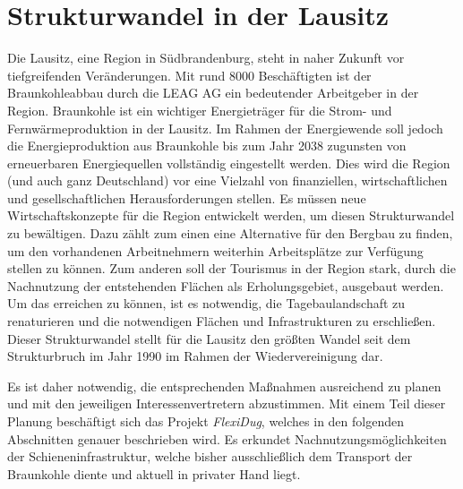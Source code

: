 \section{Strukturwandel in der Lausitz}

Die Lausitz, eine Region in Südbrandenburg, steht in naher Zukunft vor tiefgreifenden Veränderungen. Mit rund 8000 Beschäftigten \cite{noauthor_braunkohle_nodate} ist der Braunkohleabbau durch die LEAG AG ein bedeutender Arbeitgeber in der Region. Braunkohle ist ein wichtiger Energieträger für die Strom- und Fernwärmeproduktion in der Lausitz. Im Rahmen der Energiewende soll jedoch die Energieproduktion aus Braunkohle bis zum Jahr 2038 zugunsten von erneuerbaren Energiequellen vollständig eingestellt werden. Dies wird die Region (und auch ganz Deutschland) vor eine Vielzahl von finanziellen, wirtschaftlichen und gesellschaftlichen Herausforderungen stellen. Es müssen neue Wirtschaftskonzepte für die Region entwickelt werden, um diesen Strukturwandel zu bewältigen. Dazu zählt zum einen eine Alternative für den Bergbau zu finden, um den vorhandenen Arbeitnehmern weiterhin Arbeitsplätze zur Verfügung stellen zu können. Zum anderen soll der Tourismus in der Region stark, durch die Nachnutzung der entstehenden Flächen als Erholungsgebiet, ausgebaut werden. Um das erreichen zu können, ist es notwendig, die Tagebaulandschaft zu renaturieren\cite{btu_flexidug_2022} und die notwendigen Flächen und Infrastrukturen zu erschließen. Dieser Strukturwandel stellt für die Lausitz den größten Wandel seit dem Strukturbruch im Jahr 1990 im Rahmen der Wiedervereinigung dar.

Es ist daher notwendig, die entsprechenden Maßnahmen ausreichend zu planen und mit den jeweiligen Interessenvertretern abzustimmen. Mit einem Teil dieser Planung beschäftigt sich das Projekt \emph{FlexiDug}, welches in den folgenden Abschnitten genauer beschrieben wird. Es erkundet Nachnutzungsmöglichkeiten der Schieneninfrastruktur, welche bisher ausschließlich dem Transport der Braunkohle diente und aktuell in privater Hand liegt.
